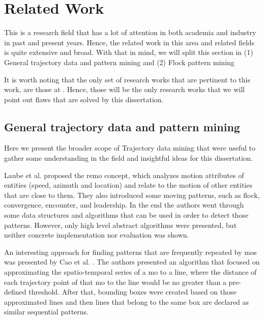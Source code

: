 \chapter{Related Work}
\label{chp:relatedwork}
This is a research field that has a lot of attention in both academia and industry in past and present years. Hence, the
related work in this area and related fields is quite extensive and broad. With that in mind, we will split this section
in (1) General trajectory data and pattern mining and (2) Flock pattern mining

It is worth noting that the only set of research works that are pertinent to this work, are those at
. Hence, those will be the only research works that we will point out flaws that are solved by
this dissertation.

\section{General trajectory data and pattern mining}
\label{sec:rel_general}
Here we present the broader scope of Trajectory data mining that were useful to gather some understanding in the field
and insightful ideas for this dissertation.

Laube et al. \citep{remo} proposed the \ac{remo} concept, which analyzes motion attributes of entities (speed, azimuth
and location) and relate to the motion of other entities that are close to them. They also introduced some moving
patterns, such as flock, convergence, encounter, and leadership. In the end the authors went through some data
structures and algorithms that can be used in order to detect those patterns. However, only high level abstract
algorithms were presented, but neither concrete implementation nor evaluation was shown.

An interesting approach for finding patterns that are frequently repeated by \acp{mo} was presented by Cao et al.
\citep{frequentpatterns}. The authors presented an algorithm that focused on approximating the spatio-temporal series of
a \ac{mo} to a line, where the distance of each trajectory point of that \ac{mo} to the line would be no greater than a
pre-defined threshold. After that, bounding boxes were created based on those approximated lines and then lines that
belong to the same box are declared as similar sequential patterns.

